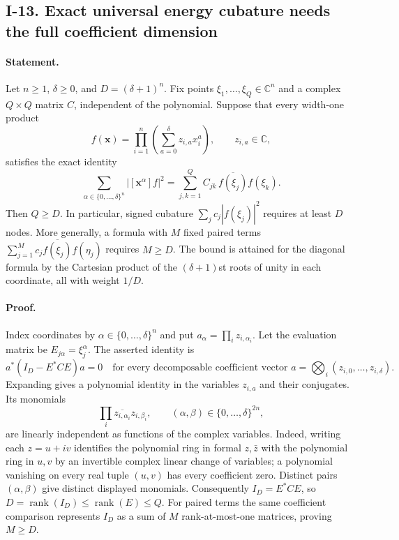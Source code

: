 \subsection{I-13. Exact universal energy cubature needs the full coefficient dimension}
\label{I-13}

\paragraph{Statement.}
Let $n\ge1$, $\delta\ge0$, and $D=(\delta+1)^n$.  Fix points
$\xi_1,\ldots,\xi_Q\in\mathbb C^n$ and a complex $Q\times Q$ matrix $C$,
independent of the polynomial.  Suppose that every width-one product
\[
 f(\mathbf x)=\prod_{i=1}^n\left(\sum_{a=0}^{\delta}z_{i,a}x_i^a\right),
 \qquad z_{i,a}\in\mathbb C,
\]
satisfies the exact identity
\[
 \sum_{\alpha\in\{0,\ldots,\delta\}^n}|[\mathbf x^\alpha]f|^2
  =\sum_{j,k=1}^Q C_{jk}\,\overline{f(\xi_j)}f(\xi_k).
\tag{I.13}\label{eq:I-cubature}
\]
Then $Q\ge D$.  In particular, signed cubature
$\sum_j c_j|f(\xi_j)|^2$ requires at least $D$ nodes.  More generally,
a formula with $M$ fixed paired terms
$\sum_{j=1}^M c_j\overline{f(\xi_j)}f(\eta_j)$ requires $M\ge D$.
The bound is attained for the diagonal formula by the Cartesian product
of the $(\delta+1)$st roots of unity in each coordinate, all with weight
$1/D$.

\paragraph{Proof.}
Index coordinates by $\alpha\in\{0,\ldots,\delta\}^n$ and put
$a_\alpha=\prod_i z_{i,\alpha_i}$.  Let the evaluation matrix be
$E_{j\alpha}=\xi_j^\alpha$.  The asserted identity is
\[
 a^*(I_D-E^*CE)a=0
\quad\text{for every decomposable coefficient vector }
a=\bigotimes_i(z_{i,0},\ldots,z_{i,\delta}).
\]
Expanding gives a polynomial identity in the variables
$z_{i,a}$ and their conjugates.  Its monomials
\[
 \prod_i\overline{z_{i,\alpha_i}}z_{i,\beta_i},
 \qquad (\alpha,\beta)\in\{0,\ldots,\delta\}^{2n},
\]
are linearly independent as functions of the complex variables.
Indeed, writing each $z=u+iv$ identifies the polynomial ring in
formal $z,\bar z$ with the polynomial ring in $u,v$ by an invertible
complex linear change of variables; a polynomial vanishing on every
real tuple $(u,v)$ has every coefficient zero.  Distinct pairs
$(\alpha,\beta)$ give distinct displayed monomials.  Consequently
$I_D=E^*CE$, so
$D=\operatorname{rank}(I_D)\le\operatorname{rank}(E)\le Q$.
For paired terms the same coefficient comparison represents $I_D$
as a sum of $M$ rank-at-most-one matrices, proving $M\ge D$.

